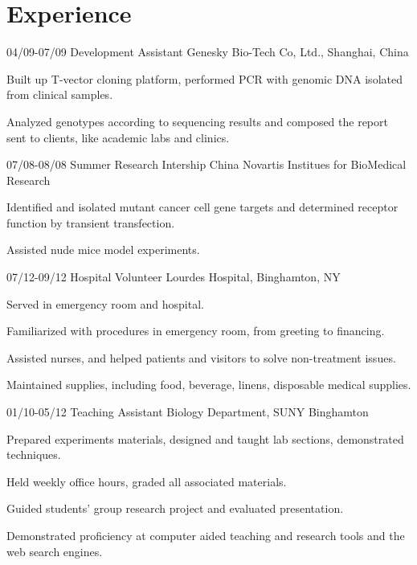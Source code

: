 \section{Experience}
\begin{entrylist}

  \entry
    {04/09-07/09}
    {Development Assistant}
		{Genesky Bio-Tech Co, Ltd., Shanghai, China}
		{
			\begin{tightemize}
				\item{Built up T-vector cloning platform, performed PCR with genomic DNA isolated
					from clinical samples.}
				\item{Analyzed genotypes according to sequencing results and composed the report
					sent to clients, like academic labs and clinics.}
			\end{tightemize}
		}

  \entry
    {07/08-08/08}
		{Summer Research Intership}
    {China Novartis Institues for BioMedical Research}
		{
			\begin{tightemize}
				\item{Identified and isolated mutant cancer cell gene targets and determined
					receptor function by transient transfection.}
				\item{Assisted nude mice model experiments.}
			\end{tightemize}
		}

    \entry
    {07/12-09/12}
		{Hospital Volunteer}
		{Lourdes Hospital, Binghamton, NY}
    {
			\begin{tightemize}
				\item{Served in emergency room and hospital.}
				\item{Familiarized with procedures in emergency room, from greeting
					to financing.}
				\item{Assisted nurses, and helped patients and visitors to solve non-treatment
					issues.}
				\item{Maintained supplies, including food, beverage, linens, disposable medical
					supplies.}
			\end{tightemize}
		}

    \entry
    {01/10-05/12}
		{Teaching Assistant}
		{Biology Department, SUNY Binghamton}
    {
			\begin{tightemize}
				\item{Prepared experiments materials, designed and taught lab sections,
					demonstrated techniques.}
				\item{Held weekly office hours, graded all associated materials.}
				\item{Guided students' group research project and evaluated
					presentation.}
				\item{Demonstrated proficiency at computer aided teaching and research tools and
					the web search engines.}
			\end{tightemize}
		}

\end{entrylist}
